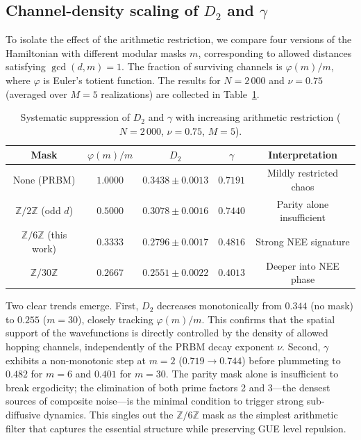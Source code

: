 \documentclass[aps,prl,preprint,superscriptaddress,floatfix]{revtex4-2}
\begin{document}
\subsection{Channel-density scaling of $D_2$ and $\gamma$}

To isolate the effect of the arithmetic restriction, we compare four versions of the Hamiltonian with different modular masks $m$, corresponding to allowed distances satisfying $\gcd(d,m)=1$. The fraction of surviving channels is $\varphi(m)/m$, where $\varphi$ is Euler's totient function. The results for $N=2\,000$ and $\nu=0.75$ (averaged over $M=5$ realizations) are collected in Table~\ref{tab:mask_comparison}.

\begin{table}[h]
\caption{Systematic suppression of $D_2$ and $\gamma$ with increasing arithmetic restriction ($N=2\,000$, $\nu=0.75$, $M=5$).}
\label{tab:mask_comparison}
\begin{ruledtabular}
\begin{tabular}{c c c c c}
\textbf{Mask} & $\varphi(m)/m$ & $D_2$ & $\gamma$ & \textbf{Interpretation} \\
\hline
None (PRBM)     & $1.0000$ & $0.3438 \pm 0.0013$ & $0.7191$ & Mildly restricted chaos \\
$\mathbb{Z}/2\mathbb{Z}$ (odd $d$) & $0.5000$ & $0.3078 \pm 0.0016$ & $0.7440$ & Parity alone insufficient \\
$\mathbb{Z}/6\mathbb{Z}$ (this work) & $0.3333$ & $0.2796 \pm 0.0017$ & $0.4816$ & Strong NEE signature \\
$\mathbb{Z}/30\mathbb{Z}$ & $0.2667$ & $0.2551 \pm 0.0022$ & $0.4013$ & Deeper into NEE phase \\
\end{tabular}
\end{ruledtabular}
\end{table}

Two clear trends emerge. First, $D_2$ decreases monotonically from $0.344$ (no mask) to $0.255$ ($m=30$), closely tracking $\varphi(m)/m$. This confirms that the spatial support of the wavefunctions is directly controlled by the density of allowed hopping channels, independently of the PRBM decay exponent $\nu$. Second, $\gamma$ exhibits a non-monotonic step at $m=2$ ($0.719 \to 0.744$) before plummeting to $0.482$ for $m=6$ and $0.401$ for $m=30$. The parity mask alone is insufficient to break ergodicity; the elimination of both prime factors 2 and 3---the densest sources of composite noise---is the minimal condition to trigger strong sub-diffusive dynamics. This singles out the $\mathbb{Z}/6\mathbb{Z}$ mask as the simplest arithmetic filter that captures the essential structure while preserving GUE level repulsion.
\end{document}
